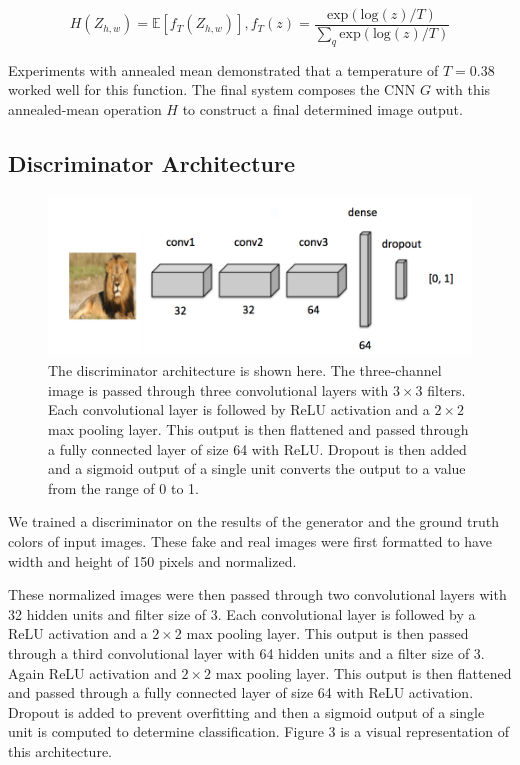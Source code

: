 \documentclass[10pt,twocolumn,letterpaper]{article}
\begin{document}
$$H(Z_{h,w}) = \mathbb{E}[f_T(Z_{h,w})], f_T(z) = \frac{\text{exp}(\text{log}(z)/T)}{\sum_q\text{exp}(\text{log}(z)/T)}$$

Experiments with annealed mean demonstrated that a temperature of $T = 0.38$ worked well for this function. The final system composes the CNN $G$ with this annealed-mean operation $H$ to construct a final determined image output. 

\subsection{Discriminator Architecture}

\begin{figure}[htp]

\centering
\includegraphics[width= \textwidth]{disc_arch.png} 
\caption{The discriminator architecture is shown here. The three-channel image is passed through three convolutional layers with $3 \times 3$ filters. Each convolutional layer is followed by ReLU activation and a $2 \times 2$ max pooling layer. This output is then flattened and passed through a fully connected layer of size 64 with ReLU. Dropout is then added and a sigmoid output of a single unit converts the output to a value from the range of 0 to 1.}

\end{figure}

We trained a discriminator on the results of the generator and the ground truth colors of input images. These fake and real images were first formatted to have width and height of 150 pixels and normalized.

These normalized images were then passed through two convolutional layers with 32 hidden units and filter size of 3. Each convolutional layer is followed by a ReLU activation and a $2 \times 2$ max pooling layer. This output is then passed through a third convolutional layer with 64 hidden units and a filter size of 3. Again ReLU activation and $2 \times 2$ max pooling layer. This output is then flattened and passed through a fully connected layer of size 64 with ReLU activation. Dropout is added to prevent overfitting and then a sigmoid output of a single unit is computed to determine classification. Figure 3 is a visual representation of this architecture.
\end{document}
